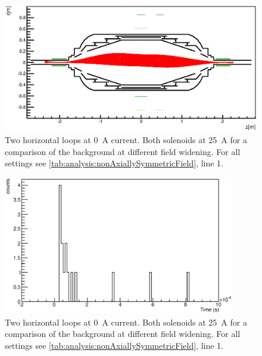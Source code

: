 \begin{figure}
\centering
	\centerline{\includegraphics[width = 1.3\linewidth]{graphics/analysis/monSpec/fieldSimulation/NA.eps} }
	
	\caption[\SI{50}{\ampere} loops]{Two horizontal loops at \SI{0}{\ampere} current. Both solenoids at \SI{25}{\ampere} for a comparison of the background at different field widening. For all settings see \ref{tab:analysis:nonAxiallySymmetricField}, line 1.}
	\label{fig:NAf}
\end{figure}

\begin{figure}[h]
\centering
	\includegraphics[width = 0.9\textwidth]{graphics/analysis/monSpec/NA.eps}
	\caption[\SI{50}{\ampere} loops]{Two horizontal loops at \SI{0}{\ampere} current. Both solenoids at \SI{25}{\ampere} for a comparison of the background at different field widening. For all settings see \ref{tab:analysis:nonAxiallySymmetricField}, line 1.}
	\label{fig:NA}
\end{figure}
\clearpage







